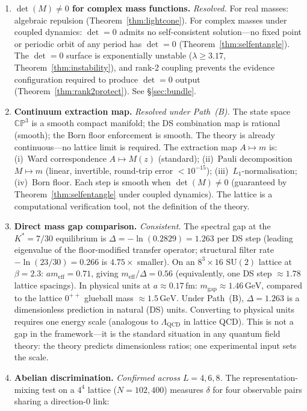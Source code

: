 \documentclass[11pt,a4paper]{article}
\theoremstyle{definition}
\theoremstyle{remark}
\newcommand{\CP}{\mathbb{CP}}
\newcommand{\SU}{\mathrm{SU}}
\begin{document}
\begin{enumerate}[nosep]
\item \textbf{$\det(M)\neq 0$ for complex mass functions.} \emph{Resolved.} For real masses: algebraic repulsion (Theorem~\ref{thm:lightcone}). For complex masses under coupled dynamics: $\det=0$ admits no self-consistent solution---no fixed point or periodic orbit of any period has $\det=0$ (Theorem~\ref{thm:selfentangle}). The $\det=0$ surface is exponentially unstable ($\lambda\geq 3.17$, Theorem~\ref{thm:instability}), and rank-2 coupling prevents the evidence configuration required to produce $\det=0$ output (Theorem~\ref{thm:rank2protect}). See \S\ref{sec:bundle}.
\item \textbf{Continuum extraction map.} \emph{Resolved under Path~(B).} The state space $\CP^3$ is a smooth compact manifold; the DS combination map is rational (smooth); the Born floor enforcement is smooth. The theory is already continuous---no lattice limit is required. The extraction map $A\mapsto m$ is: (i)~Ward correspondence $A\mapsto M(z)$ (standard); (ii)~Pauli decomposition $M\mapsto m$ (linear, invertible, round-trip error $<10^{-15}$); (iii)~$L_1$-normalisation; (iv)~Born floor. Each step is smooth when $\det(M)\neq 0$ (guaranteed by Theorem~\ref{thm:selfentangle} under coupled dynamics). The lattice is a computational verification tool, not the definition of the theory.
\item \textbf{Direct mass gap comparison.} \emph{Consistent.} The spectral gap at the $K^*=7/30$ equilibrium is $\Delta=-\ln(0.2829)=1.263$ per DS step (leading eigenvalue of the floor-modified transfer operator; structural filter rate $-\ln(23/30)=0.266$ is $4.75\times$ smaller). On an $8^3\times 16$ $\SU(2)$ lattice at $\beta=2.3$: $am_{\mathrm{eff}}=0.71$, giving $m_{\mathrm{eff}}/\Delta=0.56$ (equivalently, one DS step $\approx 1.78$ lattice spacings). In physical units at $a\approx 0.17\,\mathrm{fm}$: $m_{\mathrm{gap}}\approx 1.46\,\mathrm{GeV}$, compared to the lattice $0^{++}$ glueball mass $\approx 1.5\,\mathrm{GeV}$. Under Path~(B), $\Delta=1.263$ is a dimensionless prediction in natural (DS) units. Converting to physical units requires one energy scale (analogous to $\Lambda_{\mathrm{QCD}}$ in lattice QCD). This is not a gap in the framework---it is the standard situation in any quantum field theory: the theory predicts dimensionless ratios; one experimental input sets the scale.
\item \textbf{Abelian discrimination.} \emph{Confirmed across $L=4,6,8$.} The representation-mixing test on a $4^4$ lattice ($N=102{,}400$) measures $\delta$ for four observable pairs sharing a direction-$0$ link:


\end{enumerate}
\end{document}
